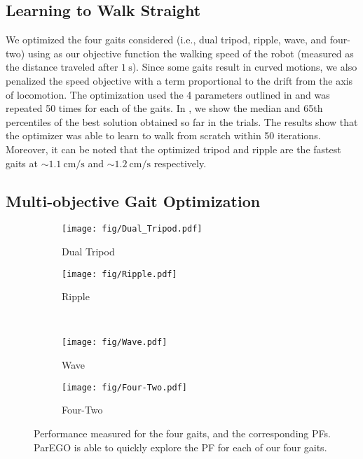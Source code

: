     
\subsection{Learning to Walk Straight}
\label{sec:results:soo}

	We optimized the four gaits considered (i.e., dual tripod, ripple, wave, and four-two) using as our objective function the walking speed of the robot (measured as the distance traveled after $\SI{1}{\second}$).
	Since some gaits result in curved motions, we also penalized the speed objective with a term proportional to the drift from the axis of locomotion.
	The optimization used the 4 parameters outlined in  and was repeated 50 times for each of the gaits. 
	In , we show the median and 65th percentiles of the best solution obtained so far in the trials.
	The results show that the optimizer was able to learn to walk from scratch within 50 iterations.
	Moreover, it can be noted that the optimized tripod and ripple are the fastest gaits at $\sim \SI[per-mode=symbol]{1.1}{\centi\meter\per\second}$ and $\sim \SI[per-mode=symbol]{1.2}{\centi\meter\per\second}$ respectively.
	
\subsection{Multi-objective Gait Optimization}
\label{sec:results:moo}
	\begin{figure}[t]
	  \centering
	  \begin{subfigure}{0.49\linewidth}
		  \texttt{[image: fig/Dual\_Tripod.pdf]}
		  \caption{Dual Tripod}
		  \label{fig:moo:1}
	  \end{subfigure}
	  \hfill  
	  \begin{subfigure}{0.49\linewidth}
		  \texttt{[image: fig/Ripple.pdf]}
		  \caption{Ripple}
		  \label{fig:moo:2}
	  \end{subfigure}
	  \\
	  \begin{subfigure}{0.49\linewidth}
		  \texttt{[image: fig/Wave.pdf]}
		  \caption{Wave}
		  \label{fig:moo:3}
	  \end{subfigure}
	  \hfill
	  \begin{subfigure}{0.49\linewidth}
		  \texttt{[image: fig/Four-Two.pdf]}
		  \caption{Four-Two}
		  \label{fig:moo:4}
	  \end{subfigure}
	  \caption{Performance measured for the four gaits, and the corresponding PFs. ParEGO is able to quickly explore the PF for each of our four gaits.}
	  \label{fig:moo}
	\end{figure}

